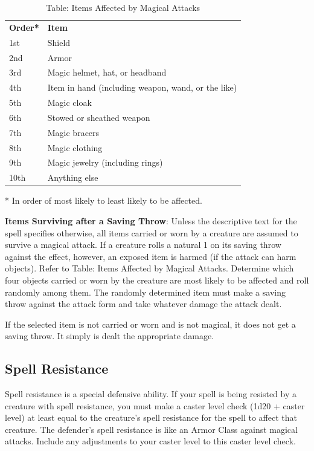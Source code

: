 \begin{table}[]
\sffamily
\caption{Table: Items Affected by Magical Attacks}
\begin{tabular}{ll}
\textbf{Order*} & \textbf{Item}\\
1st & Shield \\
 2nd & Armor \\
 3rd & Magic helmet, hat, or headband \\
 4th & Item in hand  (including weapon, wand, or the like) \\
 5th & Magic cloak \\
 6th & Stowed or sheathed weapon \\
 7th & Magic bracers \\
 8th & Magic clothing \\
 9th & Magic jewelry (including rings) \\
 10th & Anything else\\
\end{tabular}
* In order of most likely to least likely to be affected.\\
\end{table}

				
\textbf{Items Surviving after a Saving Throw}: Unless the descriptive text for the spell specifies otherwise, all items carried or worn by a creature are assumed to survive a magical attack. If a creature rolls a natural 1 on its saving throw against the effect, however, an exposed item is harmed (if the attack can harm objects). Refer to Table: Items Affected by Magical Attacks. Determine which four objects carried or worn by the creature are most likely to be affected and roll randomly among them. The randomly determined item must make a saving throw against the attack form and take whatever damage the attack dealt.
				
If the selected item is not carried or worn and is not magical, it does not get a saving throw. It simply is dealt the appropriate damage.
				
\subsection{Spell Resistance}

				
Spell resistance is a special defensive ability. If your spell is being resisted by a creature with spell resistance, you must make a caster level check (1d20 + caster level) at least equal to the creature's spell resistance for the spell to affect that creature. The defender's spell resistance is like an Armor Class against magical attacks. Include any adjustments to your caster level to this caster level check.
				
